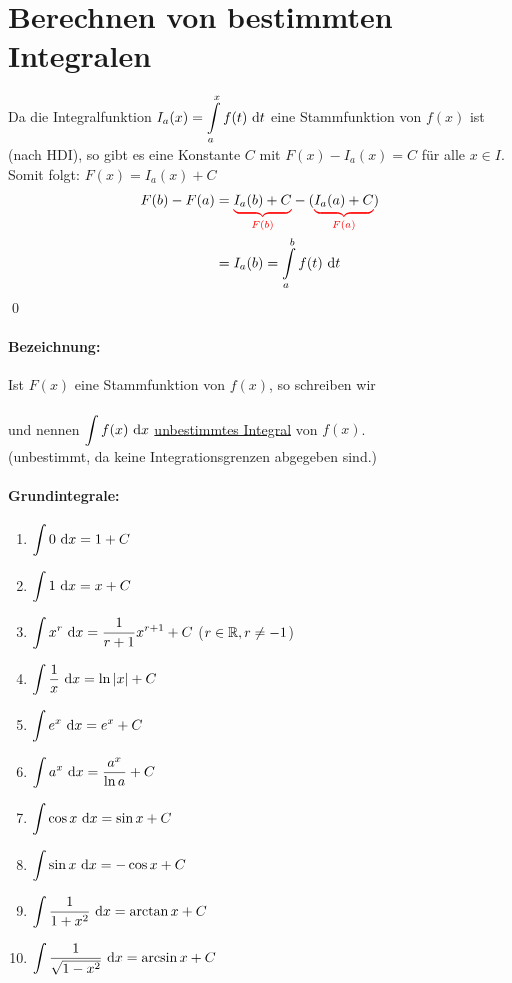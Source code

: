 \clearpage
\section{Berechnen von bestimmten Integralen}

\Beweis Da die Integralfunktion $I_a(x)=\displaystyle\int\limits_{a}^{x}f(t)\ \mathrm{d}t$ eine Stammfunktion von $f(x)$ ist (nach HDI), so gibt es eine Konstante $C$ mit $F(x)-I_a(x)=C$ für alle $x\in I$.\\
Somit folgt: $F(x)=I_a(x)+C$
\begin{align*}
F(b)-F(a)&=\textcolor{red}{\underbrace{\textcolor{black}{I_a(b)+C}}_{F(b)}}-(\textcolor{red}{\underbrace{\textcolor{black}{I_a(a)+C}}_{F(a)}})\\
&=I_a(b)=\int\limits_{a}^{b}f(t)\ \mathrm{d}t
\end{align*}
\qed %

\paragraph{Bezeichnung:} Ist $F(x)$ eine Stammfunktion von $f(x)$, so schreiben wir\\
\\
und nennen $\displaystyle\int f(x)\ \mathrm{d}x$ \ul{unbestimmtes Integral} von $f(x)$.\\
({\flqq unbestimmt\frqq}, da keine Integrationsgrenzen abgegeben sind.)

\paragraph{Grundintegrale:}
\begin{enumerate}
	\item $\displaystyle\int0\ \mathrm{d}x = 1+C$
	\item $\displaystyle\int1\ \mathrm{d}x = x+C$
	\item $\displaystyle\int x^r\ \mathrm{d}x = \dfrac{1}{r+1}x^{r+1}+C$ \qquad($r\in\mathbb{R},r\ne-1$)
	\item $\displaystyle\int\dfrac{1}{x}\ \mathrm{d}x = \ln|x|+C$
	\item $\displaystyle\int e^x\ \mathrm{d}x = e^x+C$
	\item $\displaystyle\int a^x\ \mathrm{d}x = \dfrac{a^x}{\ln a}+C$
	\item $\displaystyle\int\cos x\ \mathrm{d}x = \sin x+C$
	\item $\displaystyle\int\sin x\ \mathrm{d}x = -\cos x+C$
	\item $\displaystyle\int\dfrac{1}{1+x^2}\ \mathrm{d}x = \arctan x+C$
	\item $\displaystyle\int\dfrac{1}{\sqrt{1-x^2}}\ \mathrm{d}x = \arcsin x+C$
\end{enumerate}

